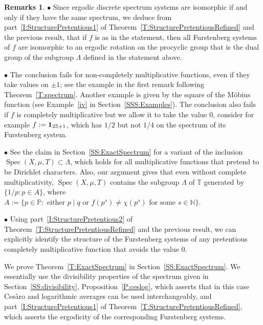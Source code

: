 \documentclass[11pt]{amsart}
\theoremstyle{definition}
\newtheorem*{remarks}{Remarks}
\newcommand{\N}{{\mathbb N}}
\renewcommand{\P}{{\mathbb P}}
\newcommand{\T}{{\mathbb T}}
\newcommand{\Z}{{\mathbb Z}}
\DeclareMathOperator{\spec}{Spec}
\begin{document}
\begin{remarks}	
	$\bullet$	 Since ergodic discrete spectrum systems are isomorphic if and only if they have the same spectrum, we deduce from part~\eqref{I:StructurePretentious1}  of  Theorem~\ref{T:StructurePretentiousRefined} and the previous result, that if $f$ is as in the statement, then all Furstenberg systems  of $f$ are isomorphic to an ergodic rotation on the procyclic group that is the dual group of the subgroup $\Lambda$ defined in the statement above. %
	
	
		
	$\bullet$ 	The conclusion fails for non-completely multiplicative functions, even if they take values on $\pm 1$;  see the example in the first remark following Theorem~\ref{T:spectrum}.
	Another example is  given by the square of the M\"obius function (see Example~\eqref{iv} in Section~\ref{SSS:Examples}). The conclusion  also fails if $f$ is completely multiplicative but we allow it to take the value $0$, consider for example $f:={\bf 1}_{2\Z+1}$, which has $1/2$ but not $1/4$  on the spectrum of its Furstenberg system.
	
	$\bullet$ 	See the claim   in Section~\ref{SS:ExactSpectrum} for a variant of the  inclusion $\spec(X,\mu,T)\subset \Lambda$, which holds for all multiplicative functions that pretend to be Dirichlet characters. Also, our argument gives that even without  complete multiplicativity,
	$\spec(X,\mu,T)$ contains the subgroup $\Lambda$  of $\T$  generated by $\{1/p\colon p\in A\}$,  where $A:=\{p\in \P\colon \text{ either } p\mid q \text{ or } f(p^s)\neq \chi(p^s) \text{ for some } s\in \N\}$.
	
	 $\bullet$ Using part~\eqref{I:StructurePretentious2} of Theorem~\ref{T:StructurePretentiousRefined} and the previous result, we can explicitly identify the structure of the Furstenberg systems of any pretentious completely multiplicative function that avoids the value $0$.
	
\end{remarks}
We prove Theorem~\ref{T:ExactSpectrum} in Section~\ref{SS:ExactSpectrum}.
We essentially use the divisibility properties of the spectrum given in Section~\ref{SS:divisibility}, Proposition~\ref{P:ceslog}, which asserts that in this case Ces\`aro and logarithmic averages can be used interchangeably, and
part~\eqref{I:StructurePretentious1} of Theorem~\ref{T:StructurePretentiousRefined}, which asserts the ergodicity of the corresponding Furstenberg systems.
\end{document}
